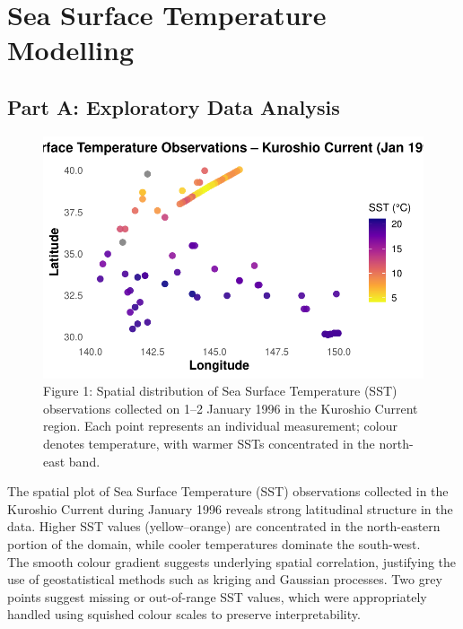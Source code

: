 \documentclass[
  11pt,
]{article}
\renewcommand*\contentsname{Table of contents}
\newcommand\contentsname{Table of contents}
\begin{document}
\renewcommand*\contentsname{Table of contents}
{
\hypersetup{linkcolor=}
\setcounter{tocdepth}{3}
\tableofcontents
}

\newpage

\section{Sea Surface Temperature
Modelling}\label{sea-surface-temperature-modelling}

\subsection{Part A: Exploratory Data
Analysis}\label{part-a-exploratory-data-analysis}

\begin{figure}[H]

{\centering \includegraphics{project_files/figure-pdf/fig-scatterplot-1.pdf}

}

\caption{Figure 1: Spatial distribution of Sea Surface Temperature (SST)
observations collected on 1--2 January 1996 in the Kuroshio Current
region. Each point represents an individual measurement; colour denotes
temperature, with warmer SSTs concentrated in the north-east band.}

\end{figure}%

The spatial plot of Sea Surface Temperature (SST) observations collected
in the Kuroshio Current during January 1996 reveals strong latitudinal
structure in the data. Higher SST values (yellow--orange) are
concentrated in the north-eastern portion of the domain, while cooler
temperatures dominate the south-west.\\
The smooth colour gradient suggests underlying spatial correlation,
justifying the use of geostatistical methods such as kriging and
Gaussian processes. Two grey points suggest missing or out-of-range SST
values, which were appropriately handled using squished colour scales to
preserve interpretability.
\end{document}

